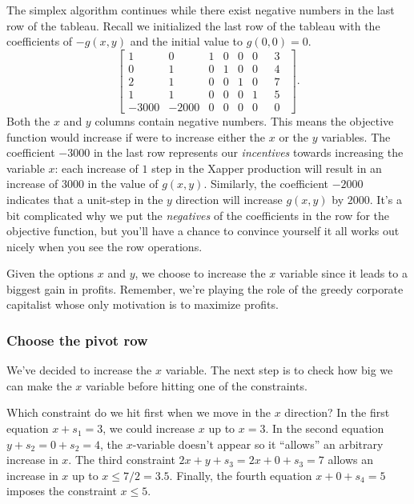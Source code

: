 \documentclass[11pt,oneside]{article}
\begin{document}
		The simplex algorithm continues while there exist negative numbers in the last row of the tableau.
		Recall we initialized the last row of the tableau with the coefficients of $-g(x,y)$
		and the initial value to $g(0,0)=0$.
		\[
			\left[
			\begin{array}{rrrrrr|r}
				    1&     0& 1& 0& 0& 0 \ \ & \ 3    \  \   \\ 
				    0&     1& 0& 1& 0& 0 \ \ & \  4    \  \   \\ 
				    2&     1& 0& 0& 1& 0 \ \ & \  7    \  \   \\ 
				    1&     1& 0& 0& 0& 1\ \ & \  5      \  \ \\ 
				-3000& -2000& 0& 0& 0& 0 \ \ & \  0      \  \ 
			\end{array}
			\right].
		\]
		Both the $x$ and $y$ columns contain negative numbers.
		This means the objective function would increase if were to increase either the $x$ or the $y$ variables.
		The coefficient $-3000$ in the last row represents our \emph{incentives} towards increasing the variable $x$:
		each increase of $1$ step in the Xapper production will result 	in an increase of $3000$ in the value of $g(x,y)$.
		Similarly, the coefficient $-2000$ indicates that a unit-step in the $y$ direction will increase $g(x,y)$ by $2000$.
		It's a bit complicated why we put the \emph{negatives} of the coefficients in the row for the objective function,
		but you'll have a chance to convince yourself it all works out nicely when you see the row operations.

		Given the options $x$ and $y$,
		we choose to increase the $x$ variable since it leads to a biggest gain in profits.
		Remember, we're playing the role of the greedy corporate capitalist whose only motivation is to maximize profits.
		
		
	\subsubsection{Choose the pivot row}
	
		We've decided to increase the $x$ variable.
		The next step is to check how big we can make the $x$ variable before hitting one of the constraints.
		
		Which constraint do we hit first when we move in the $x$ direction?
		In the first equation $x + s_1 = 3$, we could increase $x$ up to $x=3$.
		In the second equation $y + s_2 = 0 + s_2 = 4$, the $x$-variable doesn't appear so it ``allows'' an arbitrary increase in $x$.
		The third constraint $2x + y + s_3 = 2x + 0 + s_3  = 7$ allows an increase in $x$ up to $x \leq 7/2=3.5$.
		Finally, the fourth equation  $x + 0+ s_4 = 5$ imposes the constraint $x\leq 5$.		
\end{document}
